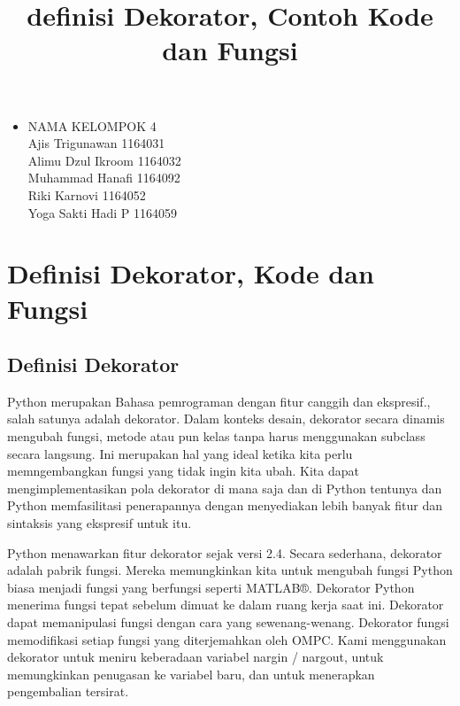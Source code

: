 \documentclass[12pt,a4paper]{article}
\begin{document}
\title{definisi Dekorator, Contoh Kode dan Fungsi}
\maketitle

\begin{itemize}
\item
NAMA KELOMPOK 4\\
Ajis Trigunawan			1164031\\
Alimu Dzul Ikroom		1164032\\
Muhammad Hanafi			1164092\\
Riki Karnovi			1164052\\
Yoga Sakti Hadi P		1164059\\
\end{itemize}

\section{Definisi Dekorator, Kode dan Fungsi}

\subsection{Definisi Dekorator}
Python merupakan Bahasa pemrograman dengan fitur canggih dan ekspresif., salah satunya adalah dekorator. Dalam konteks desain, dekorator secara dinamis mengubah fungsi, metode atau pun kelas tanpa harus menggunakan subclass secara langsung. Ini merupakan hal yang ideal ketika kita perlu memngembangkan fungsi yang tidak ingin kita ubah. Kita dapat mengimplementasikan pola dekorator di mana saja dan di Python tentunya  dan Python memfasilitasi penerapannya dengan menyediakan lebih banyak fitur dan sintaksis yang ekspresif untuk itu.

Python menawarkan fitur dekorator sejak versi 2.4. Secara sederhana, dekorator adalah pabrik fungsi. Mereka memungkinkan kita untuk mengubah fungsi Python biasa menjadi fungsi yang berfungsi seperti MATLAB®. Dekorator Python menerima fungsi tepat sebelum dimuat ke dalam ruang kerja saat ini. Dekorator dapat memanipulasi fungsi dengan cara yang sewenang-wenang. Dekorator fungsi memodifikasi setiap fungsi yang diterjemahkan oleh OMPC. Kami menggunakan dekorator untuk meniru keberadaan variabel nargin / nargout, untuk memungkinkan penugasan ke variabel baru, dan untuk menerapkan pengembalian tersirat.
\end{document}

